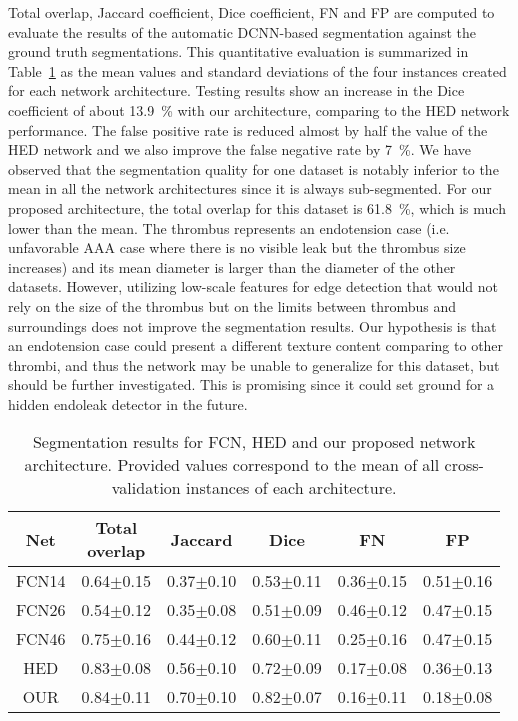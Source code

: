 \documentclass[preprint,authoryear,12pt]{elsarticle}
\begin{document}
Total overlap, Jaccard coefficient, Dice coefficient, FN and FP are computed to evaluate the results of the automatic DCNN-based segmentation against the ground truth segmentations. This quantitative evaluation is summarized in Table~\ref{tab:results} as the mean values and standard deviations of the four instances created for each network architecture. Testing results show an increase in the Dice coefficient of about 13.9~\% with our architecture, comparing to the HED network performance. The false positive rate is reduced almost by half the value of the HED network and we also improve the false negative rate by 7~\%. We have observed that the segmentation quality for one dataset is notably inferior to the mean in all the network architectures since it is always sub-segmented. For our proposed architecture, the total overlap for this dataset is 61.8~\%, which is much lower than the mean. The thrombus represents an endotension case (i.e. unfavorable AAA case where there is no visible leak but the thrombus size increases) and its mean diameter is larger than the diameter of the other datasets. However, utilizing low-scale features for edge detection that would not rely on the size of the thrombus but on the limits between thrombus and surroundings does not improve the segmentation results. Our hypothesis is that an endotension case could present a different texture content comparing to other thrombi, and thus the network may be unable to generalize for this dataset, but should be further investigated. This is promising since it could set ground for a hidden endoleak detector in the future.

\begin{table}[htb]
\centering
\begin{tabular}{c|c|c|c|c|c}
\hline
Net & \thead{Total \\ overlap} & Jaccard & Dice & FN & FP \\
\hline
FCN14 & 0.64\(\pm\)0.15 & 0.37\(\pm\)0.10 & 0.53\(\pm\)0.11 & 0.36\(\pm\)0.15 & 0.51\(\pm\)0.16 \\
FCN26 & 0.54\(\pm\)0.12 & 0.35\(\pm\)0.08 &  0.51\(\pm\)0.09 & 0.46\(\pm\)0.12 & 0.47\(\pm\)0.15\\
FCN46 & 0.75\(\pm\)0.16 &  0.44\(\pm\)0.12 & 0.60\(\pm\)0.11 & 0.25\(\pm\)0.16 & 0.47\(\pm\)0.15\\
HED & 0.83\(\pm\)0.08 & 0.56\(\pm\)0.10 & 0.72\(\pm\)0.09 & 0.17\(\pm\)0.08 & 0.36\(\pm\)0.13  \\
OUR & 0.84\(\pm\)0.11 & 0.70\(\pm\)0.10 & 0.82\(\pm\)0.07 & 0.16\(\pm\)0.11 &  0.18\(\pm\)0.08
\end{tabular}
\caption{\label{tab:results}Segmentation results for FCN, HED and our proposed network architecture. Provided values correspond to the mean of all cross-validation instances of each architecture.}
\end{table}
\end{document}
